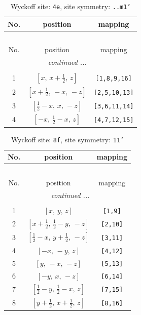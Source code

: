 \documentclass[fleqn,8pt]{jsarticle}
\begin{document}
\begin{longtable}{ccc}
\caption{Wyckoff site: {\tt 4e}, site symmetry: {\tt ..m1'}}
 \\
 \hline \hline
No. & position & mapping \\ \hline \endfirsthead

\multicolumn{2}{l}{\tablename\ \thetable{}} \\
 \hline \hline
No. & position & mapping \\ \hline \endhead

 \hline \hline
\multicolumn{2}{r}{\footnotesize\it continued ...} \\ \endfoot

 \hline \hline
\multicolumn{2}{r}{} \\ \endlastfoot

1 & $\left[ x,\, x + \frac{1}{2},\, z \right]$ & {\tt [1,8,9,16]} \\ \hline
2 & $\left[ x + \frac{1}{2},\, - x,\, - z \right]$ & {\tt [2,5,10,13]} \\ \hline
3 & $\left[ \frac{1}{2} - x,\, x,\, - z \right]$ & {\tt [3,6,11,14]} \\ \hline
4 & $\left[ - x,\, \frac{1}{2} - x,\, z \right]$ & {\tt [4,7,12,15]} \\
\end{longtable}
\renewcommand{\arraystretch}{1.2}
\begin{longtable}{ccc}
\caption{Wyckoff site: {\tt 8f}, site symmetry: {\tt 11'}}
 \\
 \hline \hline
No. & position & mapping \\ \hline \endfirsthead

\multicolumn{2}{l}{\tablename\ \thetable{}} \\
 \hline \hline
No. & position & mapping \\ \hline \endhead

 \hline \hline
\multicolumn{2}{r}{\footnotesize\it continued ...} \\ \endfoot

 \hline \hline
\multicolumn{2}{r}{} \\ \endlastfoot

1 & $\left[ x,\, y,\, z \right]$ & {\tt [1,9]} \\ \hline
2 & $\left[ x + \frac{1}{2},\, \frac{1}{2} - y,\, - z \right]$ & {\tt [2,10]} \\ \hline
3 & $\left[ \frac{1}{2} - x,\, y + \frac{1}{2},\, - z \right]$ & {\tt [3,11]} \\ \hline
4 & $\left[ - x,\, - y,\, z \right]$ & {\tt [4,12]} \\ \hline
5 & $\left[ y,\, - x,\, - z \right]$ & {\tt [5,13]} \\ \hline
6 & $\left[ - y,\, x,\, - z \right]$ & {\tt [6,14]} \\ \hline
7 & $\left[ \frac{1}{2} - y,\, \frac{1}{2} - x,\, z \right]$ & {\tt [7,15]} \\ \hline
8 & $\left[ y + \frac{1}{2},\, x + \frac{1}{2},\, z \right]$ & {\tt [8,16]} \\
\end{longtable}
\end{document}
